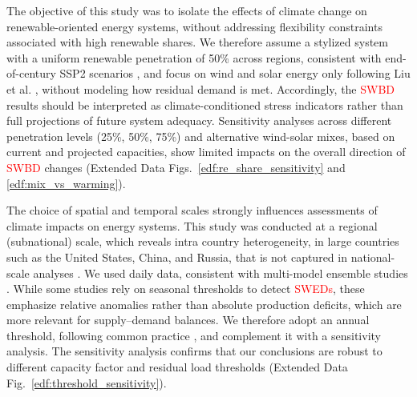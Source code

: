 \documentclass[pdflatex,sn-mathphys-num]{sn-jnl}%
\begin{document}
The objective of this study was to isolate the effects of climate change on renewable-oriented energy systems, without addressing flexibility constraints associated with high renewable shares. We therefore assume a stylized system with a uniform renewable penetration of 50\% across regions, consistent with end-of-century SSP2 scenarios \cite{byersAR6ScenariosDatabase2022}, and focus on wind and solar energy only following Liu et al. \cite{liuClimateChangeImpacts2023}, without modeling how residual demand is met. Accordingly, the \textcolor{red}{SWBD} results should be interpreted as climate-conditioned stress indicators rather than full projections of future system adequacy. Sensitivity analyses across different penetration levels (25\%, 50\%, 75\%) and alternative wind-solar mixes, based on current and projected capacities, show limited impacts on the overall direction of \textcolor{red}{SWBD} changes (Extended Data Figs.~\ref{edf:re_share_sensitivity} and \ref{edf:mix_vs_warming}).



The choice of spatial and temporal scales strongly influences assessments of climate impacts on energy systems. This study was conducted at a regional (subnational) scale, which reveals intra country heterogeneity, in large countries such as the United States, China, and Russia, that is not captured in national-scale analyses \cite{liuClimateChangeImpacts2023, zhengStrategiesClimateresilientGlobal2025}.
We used daily data, consistent with multi-model ensemble studies \cite{oteroCopulabasedAssessmentRenewable2022, vanderwielMeteorologicalConditionsLeading2019}. While some studies rely on seasonal thresholds to detect \textcolor{red}{SWEDs}, these emphasize relative anomalies rather than absolute production deficits, which are more relevant for supply–demand balances. We therefore adopt an annual threshold, following common practice \cite{wilczakWindSolarEnergy2025}, and complement it with a sensitivity analysis. The sensitivity analysis confirms that our conclusions are robust to different capacity factor and residual load thresholds (Extended Data Fig.~\ref{edf:threshold_sensitivity}).
\end{document}
